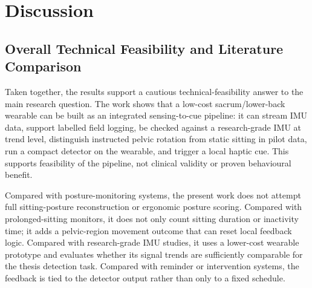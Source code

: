 \chapter{Discussion}\label{ch:discussion}

\section{Overall Technical Feasibility and Literature Comparison}

Taken together, the results support a cautious technical-feasibility answer to the main research question. The work shows that a low-cost sacrum/lower-back wearable can be built as an integrated sensing-to-cue pipeline: it can stream IMU data, support labelled field logging, be checked against a research-grade IMU at trend level, distinguish instructed pelvic rotation from static sitting in pilot data, run a compact detector on the wearable, and trigger a local haptic cue. This supports feasibility of the pipeline, not clinical validity or proven behavioural benefit.

Compared with posture-monitoring systems, the present work does not attempt full sitting-posture reconstruction or ergonomic posture scoring. Compared with prolonged-sitting monitors, it does not only count sitting duration or inactivity time; it adds a pelvic-region movement outcome that can reset local feedback logic. Compared with research-grade IMU studies, it uses a lower-cost wearable prototype and evaluates whether its signal trends are sufficiently comparable for the thesis detection task. Compared with reminder or intervention systems, the feedback is tied to the detector output rather than only to a fixed schedule.

